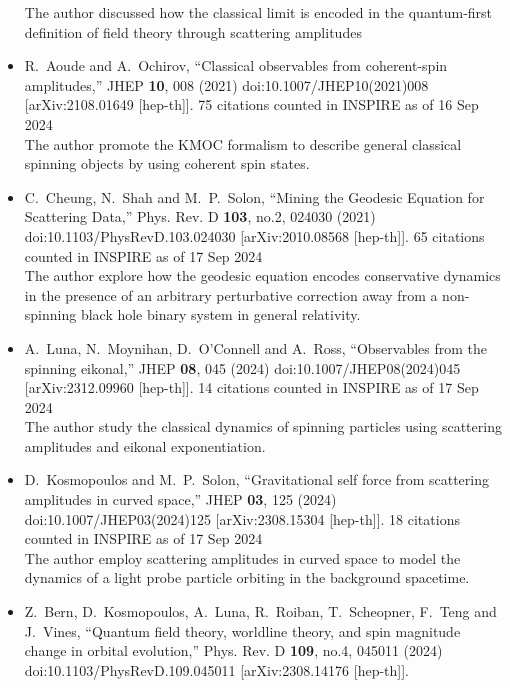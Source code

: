 \documentclass[a4paper,12pt]{article}
\begin{document}
\begin{itemize}
    The author discussed how the classical limit is encoded in the quantum-first definition of field theory through scattering amplitudes
    \item %
    R.~Aoude and A.~Ochirov,
    ``Classical observables from coherent-spin amplitudes,''
    JHEP \textbf{10}, 008 (2021)
    doi:10.1007/JHEP10(2021)008
    [arXiv:2108.01649 [hep-th]].
    75 citations counted in INSPIRE as of 16 Sep 2024\\
    The author promote the KMOC formalism  to describe general classical spinning objects by using coherent spin states. 
    \item %
    C.~Cheung, N.~Shah and M.~P.~Solon,
    ``Mining the Geodesic Equation for Scattering Data,''
    Phys. Rev. D \textbf{103}, no.2, 024030 (2021)
    doi:10.1103/PhysRevD.103.024030
    [arXiv:2010.08568 [hep-th]].
    65 citations counted in INSPIRE as of 17 Sep 2024\\
    The author explore how the geodesic equation encodes conservative dynamics in the presence of an arbitrary
    perturbative correction away from a non-spinning black hole binary system in general relativity.
    \item %
    A.~Luna, N.~Moynihan, D.~O'Connell and A.~Ross,
    ``Observables from the spinning eikonal,''
    JHEP \textbf{08}, 045 (2024)
    doi:10.1007/JHEP08(2024)045
    [arXiv:2312.09960 [hep-th]].
    14 citations counted in INSPIRE as of 17 Sep 2024\\
    The author study the classical dynamics of spinning particles using scattering amplitudes
 and eikonal exponentiation.
    \item %
    D.~Kosmopoulos and M.~P.~Solon,
    ``Gravitational self force from scattering amplitudes in curved space,''
    JHEP \textbf{03}, 125 (2024)
    doi:10.1007/JHEP03(2024)125
    [arXiv:2308.15304 [hep-th]].
    18 citations counted in INSPIRE as of 17 Sep 2024\\
    The author employ scattering amplitudes in curved space to model the dynamics of a
light probe particle orbiting in the background spacetime.
    \item %
    Z.~Bern, D.~Kosmopoulos, A.~Luna, R.~Roiban, T.~Scheopner, F.~Teng and J.~Vines,
    ``Quantum field theory, worldline theory, and spin magnitude change in orbital evolution,''
    Phys. Rev. D \textbf{109}, no.4, 045011 (2024)
    doi:10.1103/PhysRevD.109.045011
    [arXiv:2308.14176 [hep-th]].

\end{itemize}
\end{document}
